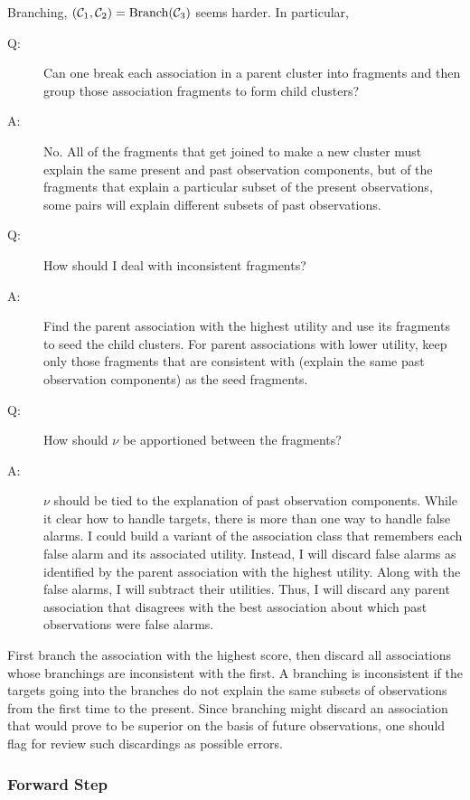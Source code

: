\documentclass[12pt]{article}
\newcommand{\cC}{{\cal C}}
\begin{document}
Branching, $(\cC_1,\cC_2) = \text{Branch}(\cC_3)$ seems harder.  In
particular,
\begin{description}
\item[Q:] Can one break each association in a parent
  cluster into fragments and then group those association fragments to
  form child clusters?
\item[A:] No.  All of the fragments that get joined to make a new
  cluster must explain the same present and past observation
  components, but of the fragments that explain a particular subset of
  the present observations, some pairs will explain different subsets
  of past observations.
\item[Q:] How should I deal with inconsistent fragments?
\item[A:] Find the parent association with the highest utility and use
  its fragments to seed the child clusters.  For parent associations
  with lower utility, keep only those fragments that are consistent
  with (explain the same past observation components) as the seed
  fragments.
\item[Q:] How should $\nu$ be apportioned between the fragments?
\item[A:] $\nu$ should be tied to the explanation of past observation
  components.  While it clear how to handle targets, there is more
  than one way to handle false alarms.  I could build a variant of the
  association class that remembers each false alarm and its associated
  utility.  Instead, I will discard false alarms as identified by the
  parent association with the highest utility.  Along with the false
  alarms, I will subtract their utilities.  Thus, I will discard any
  parent association that disagrees with the best association about
  which past observations were false alarms.
\end{description}
First branch the association with the highest score, then discard all
associations whose branchings are inconsistent with the first.  A
branching is inconsistent if the targets going into the branches do
not explain the same subsets of observations from the first time to
the present.  Since branching might discard an association that would
prove to be superior on the basis of future observations, one should
flag for review such discardings as possible errors.

\subsubsection{Forward Step}
\label{sec:forward_b_m}
\end{document}
